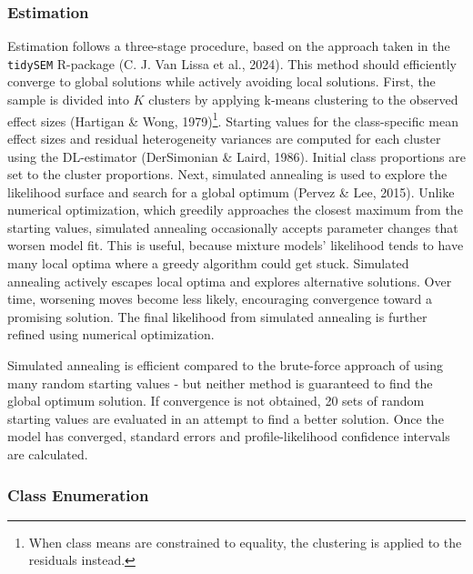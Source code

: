 \documentclass[
  english,
  man, noextraspace,floatsintext]{apa6}
\begin{document}
\subsubsection{Estimation}\label{estimation}

Estimation follows a three-stage procedure, based on the approach taken in the \texttt{tidySEM} R-package (C. J. Van Lissa et al., 2024).
This method should efficiently converge to global solutions while actively avoiding local solutions.
First, the sample is divided into \(K\) clusters by applying k-means clustering to the observed effect sizes (Hartigan \& Wong, 1979)\footnote{When class means are constrained to equality, the clustering is applied to the residuals instead.}.
Starting values for the class-specific mean effect sizes and residual heterogeneity variances are computed for each cluster using the DL-estimator (DerSimonian \& Laird, 1986).
Initial class proportions are set to the cluster proportions.
Next, simulated annealing is used to explore the likelihood surface and search for a global optimum (Pervez \& Lee, 2015).
Unlike numerical optimization, which greedily approaches the closest maximum from the starting values,
simulated annealing occasionally accepts parameter changes that worsen model fit.
This is useful, because mixture models' likelihood tends to have many local optima where a greedy algorithm could get stuck.
Simulated annealing actively escapes local optima and explores alternative solutions.
Over time, worsening moves become less likely, encouraging convergence toward a promising solution.
The final likelihood from simulated annealing is further refined using numerical optimization.

Simulated annealing is efficient compared to the brute-force approach of using many random starting values - but neither method is guaranteed to find the global optimum solution.
If convergence is not obtained,
20 sets of random starting values are evaluated in an attempt to find a better solution.
Once the model has converged, standard errors and profile-likelihood confidence intervals are calculated.

\subsubsection{Class Enumeration}\label{class-enumeration}
\end{document}
